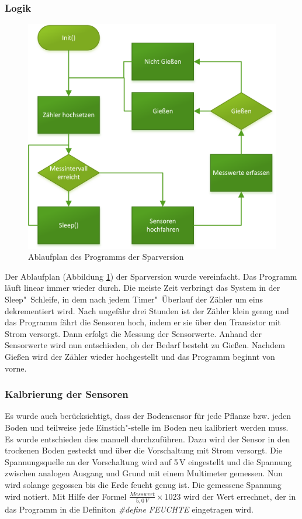 	\subsubsection{Logik}
		\begin{figure}[!h]
	\centering
	\includegraphics[width=0.8\linewidth]{Diagramme/SV_Ablaufdiagramm.png}
	\caption{Ablaufplan des Programms der Sparversion}
	\label{fig-SV_Ablaufplan}
\end{figure}

	Der Ablaufplan (Abbildung \ref{fig-SV_Ablaufplan}) der Sparversion wurde vereinfacht. Das Programm läuft linear immer wieder durch.
	Die meiste Zeit verbringt das System in der \glqq Sleep"~Schleife\grqq, in dem nach jedem Timer"~Überlauf der Zähler um eins dekrementiert wird.
	Nach ungefähr drei Stunden ist der Zähler klein genug und das Programm fährt die Sensoren hoch, indem er sie über den Transistor mit Strom versorgt.
	Dann erfolgt die Messung der Sensorwerte.
	Anhand der Sensorwerte wird nun entschieden, ob der Bedarf besteht zu Gießen.
	Nachdem Gießen wird der Zähler wieder hochgestellt und das Programm beginnt von vorne.
	\subsubsection{Kalbrierung der Sensoren}
	Es wurde auch berücksichtigt, dass der Bodensensor für jede Pflanze bzw. jeden Boden und teilweise jede Einstich"-stelle im Boden neu kalibriert werden muss.
	Es wurde entschieden dies manuell durchzuführen. 
	Dazu wird der Sensor in den trockenen Boden gesteckt und über die Vorschaltung mit Strom versorgt.
	Die Spannungsquelle an der Vorschaltung wird auf 5\,V eingestellt und die Spannung zwischen analogen Ausgang und Grund mit einem Multimeter gemessen.
	Nun wird solange gegossen bis die Erde feucht genug ist. Die gemessene Spannung wird notiert.
	Mit Hilfe der Formel \begin{math} { \frac{Messwert}{5,0\,V} } \times 1023 \end{math} wird der Wert errechnet, der in das Programm in die Definiton \emph{\#define FEUCHTE} eingetragen wird.
	

